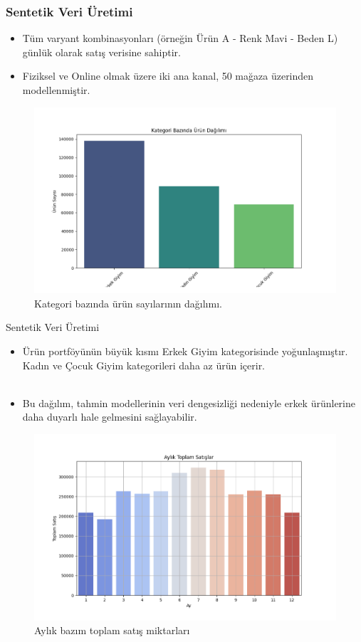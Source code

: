 \documentclass[12pt]{beamer}
\begin{document}
	
	
	\begin{frame}
		\frametitle{Sentetik Veri Üretimi}
		\begin{itemize}
			\item Tüm varyant kombinasyonları (örneğin Ürün A - Renk Mavi -
			Beden L) günlük olarak satış verisine sahiptir.
			\item Fiziksel ve Online olmak üzere iki ana kanal, 50 mağaza
			üzerinden modellenmiştir.
		\end{itemize}
	\end{frame}
	
	\begin{frame}
		\begin{figure}
			\centering
			\includegraphics[width=0.65\linewidth]{figures/category_distribution.png}
			{\small \caption {Kategori bazında ürün sayılarının dağılımı.}}
		\end{figure}
	\end{frame}
	
	\begin{frame}{Sentetik Veri Üretimi}
		\begin{itemize}
			\item Ürün portföyünün büyük kısmı Erkek Giyim kategorisinde
			yoğunlaşmıştır. Kadın ve Çocuk Giyim kategorileri daha az ürün içerir.
			\\~\\
			\item	Bu dağılım, tahmin modellerinin veri dengesizliği
			nedeniyle erkek ürünlerine daha duyarlı hale gelmesini sağlayabilir.
		\end{itemize}
	\end{frame}
	
	\begin{frame}
		\begin{figure}
			\centering
			\includegraphics[width=0.65\linewidth]{figures/monthly_total_sales.png}
			
			{\small \caption{Aylık bazım toplam satış miktarları}}
		\end{figure}	
	\end{frame}
	
\end{document}
